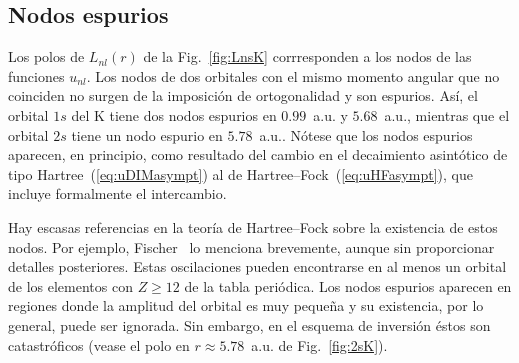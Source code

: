 \subsection{Nodos espurios}
\label{subsec:espuriosHF}

Los polos de $L_{nl}(r)$ de la Fig.~\ref{fig:LnsK} corrresponden a los 
nodos de las funciones $u_{nl}$. Los nodos de dos orbitales con el mismo 
momento angular que no coinciden no surgen de la imposición de 
ortogonalidad y son espurios. Así, el orbital $1s$ del K tiene dos nodos 
espurios en $0.99$~a.u. y $5.68$~a.u., mientras que el orbital $2s$ 
tiene un nodo espurio en $5.78$~a.u.. Nótese que los nodos espurios 
aparecen, en principio, como resultado del cambio en el decaimiento 
asintótico de tipo Hartree~(\ref{eq:uDIMasympt}) al de 
Hartree--Fock~(\ref{eq:uHFasympt}), que incluye formalmente el 
intercambio.

Hay escasas referencias en la teoría de Hartree--Fock sobre la 
existencia de estos nodos. Por ejemplo, Fischer~\cite{FroeseFischer:97} 
lo menciona brevemente, aunque sin proporcionar detalles posteriores. 
Estas oscilaciones pueden encontrarse en al menos un orbital de los 
elementos con $Z\ge 12$ de la tabla periódica. Los nodos espurios 
aparecen en regiones donde la amplitud del orbital es muy pequeña y su 
existencia, por lo general, puede ser ignorada. Sin embargo, en el esquema de inversión éstos son catastróficos (vease el polo en 
$r\approx 5.78$~a.u. de Fig.~\ref{fig:2sK}).


